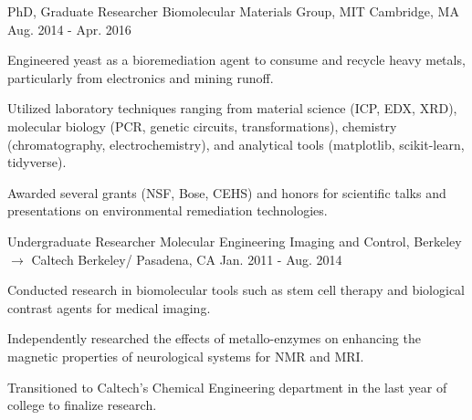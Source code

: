 

\begin{cventries}

\cventry
    {PhD, Graduate Researcher} %
    {Biomolecular Materials Group, MIT} %
    {Cambridge, MA} %
    {Aug. 2014 - Apr. 2016} %
    {
      \begin{cvitems} %
        \item {Engineered yeast as a bioremediation agent to consume and recycle heavy metals, particularly from electronics and mining runoff.}
        \item {Utilized laboratory techniques ranging from material science (ICP, EDX, XRD), molecular biology (PCR, genetic circuits, transformations), chemistry (chromatography, electrochemistry), and analytical tools (matplotlib, scikit-learn, tidyverse).}
        \item {Awarded several grants (NSF, Bose, CEHS) and honors for scientific talks and presentations on environmental remediation technologies.}
      \end{cvitems}
    }

 \cventry
    {Undergraduate Researcher} %
    {Molecular Engineering Imaging and Control, Berkeley $\rightarrow$ Caltech} %
    {Berkeley/ Pasadena, CA} %
    {Jan. 2011 - Aug. 2014} %
    {
      \begin{cvitems} %
        \item {Conducted research in biomolecular tools such as stem cell therapy and biological contrast agents for medical imaging.}
        \item{Independently researched the effects of metallo-enzymes on enhancing the magnetic properties of neurological systems for NMR and MRI.}
        \item {Transitioned to Caltech's Chemical Engineering department in the last year of college to finalize research.}
      \end{cvitems}
    }

\end{cventries}
